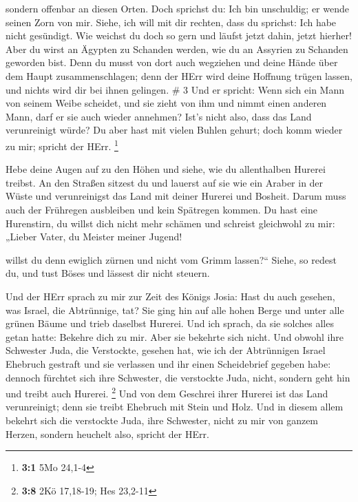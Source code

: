 sondern offenbar an diesen Orten.  Doch sprichst du: Ich
bin unschuldig; er wende seinen Zorn von mir. Siehe, ich will mit dir
rechten, dass du sprichst: Ich habe nicht gesündigt.  Wie
weichst du doch so gern und läufst jetzt dahin, jetzt hierher! Aber du
wirst an Ägypten zu Schanden werden, wie du an Assyrien zu Schanden
geworden bist.  Denn du musst von dort auch wegziehen und
deine Hände über dem Haupt zusammenschlagen; denn der HErr wird deine
Hoffnung trügen lassen, und nichts wird dir bei ihnen gelingen. \# 3
 Und er spricht: Wenn sich ein Mann von seinem Weibe
scheidet, und sie zieht von ihm und nimmt einen anderen Mann, darf er
sie auch wieder annehmen? Ist's nicht also, dass das Land verunreinigt
würde? Du aber hast mit vielen Buhlen gehurt; doch komm wieder zu mir;
spricht der HErr. \footnote{\textbf{3:1} 5Mo 24,1-4}

 Hebe deine Augen auf zu den Höhen und siehe, wie du
allenthalben Hurerei treibst. An den Straßen sitzest du und lauerst auf
sie wie ein Araber in der Wüste und verunreinigst das Land mit deiner
Hurerei und Bosheit.  Darum muss auch der Frühregen
ausbleiben und kein Spätregen kommen. Du hast eine Hurenstirn, du willst
dich nicht mehr schämen  und schreist gleichwohl zu mir:
„Lieber Vater, du Meister meiner Jugend!

 willst du denn ewiglich zürnen und nicht vom Grimm
lassen?{}`` Siehe, so redest du, und tust Böses und lässest dir nicht
steuern.

 Und der HErr sprach zu mir zur Zeit des Königs Josia: Hast
du auch gesehen, was Israel, die Abtrünnige, tat? Sie ging hin auf alle
hohen Berge und unter alle grünen Bäume und trieb daselbst Hurerei.
 Und ich sprach, da sie solches alles getan hatte: Bekehre
dich zu mir. Aber sie bekehrte sich nicht. Und obwohl ihre Schwester
Juda, die Verstockte, gesehen hat,  wie ich der Abtrünnigen
Israel Ehebruch gestraft und sie verlassen und ihr einen Scheidebrief
gegeben habe: dennoch fürchtet sich ihre Schwester, die verstockte Juda,
nicht, sondern geht hin und treibt auch Hurerei. \footnote{\textbf{3:8}
  2Kö 17,18-19; Hes 23,2-11}  Und von dem Geschrei ihrer
Hurerei ist das Land verunreinigt; denn sie treibt Ehebruch mit Stein
und Holz.  Und in diesem allem bekehrt sich die verstockte
Juda, ihre Schwester, nicht zu mir von ganzem Herzen, sondern heuchelt
also, spricht der HErr.

